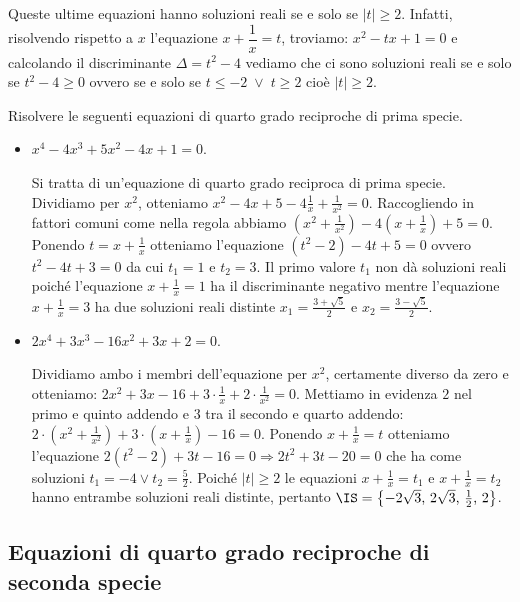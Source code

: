 Queste ultime equazioni hanno soluzioni reali se e solo se $|t|\ge 2$. Infatti, risolvendo rispetto a $x$ l'equazione $x+\dfrac 1 x=t$, troviamo: $x^2-tx+1=0$ e calcolando il discriminante $\Delta =t^2-4$ vediamo che ci sono soluzioni reali se e solo se $t^2-4\ge 0$ ovvero se e solo se $t\le -2 \;\vee\; t\ge 2$ cioè $|t|\ge 2$.
\begin{exrig}
 \begin{esempio}
 Risolvere le seguenti equazioni di quarto grado reciproche di prima specie.
 \begin{itemize}
 \item $x^4-4x^3+5x^2-4x+1=0$.

 Si tratta di un'equazione di quarto grado reciproca di prima specie. Dividiamo per $x^2$, otteniamo $x^2-4x+5-4\frac 1 x+\frac 1{x^2}=0$. Raccogliendo in fattori comuni come nella regola abbiamo $\left(x^2+\frac 1{x^2}\right)-4\left(x+\frac 1 x\right)+5=0$. Ponendo $t=x+\frac 1 x$ otteniamo l'equazione $ \left(t^2-2\right)-4t+5=0$ ovvero $t^2-4t+3=0$ da cui $t_1=1$ e $t_2=3$. Il primo valore $t_1$ non dà soluzioni reali poiché l'equazione $x+\frac 1 x=1$ ha il discriminante negativo mentre l'equazione $x+\frac 1 x=3$ ha due soluzioni reali distinte $x_1=\frac{3+\sqrt 5} 2$ e $x_2=\frac{3-\sqrt 5} 2$.

 \item $ 2x^4+3x^3-16x^2+3x+2=0 $.

 Dividiamo ambo i membri dell'equazione per $x^2$, certamente diverso da zero e otteniamo: $2x^2+3x-16+3\cdot \frac 1 x+2\cdot \frac 1{x^2}=0$. Mettiamo in evidenza $ 2 $ nel primo e quinto addendo e $ 3 $ tra il secondo e quarto addendo: $2\cdot \left(x^2+\frac 1{x^2}\right)+3\cdot \left(x+\frac 1 x\right)-16=0$. Ponendo $x+\frac 1 x=t$ otteniamo l'equazione $2(t^2-2)+3t-16=0\Rightarrow 2t^2+3t-20=0$ che ha come soluzioni $t_1=-4\vee t_2=\frac 5 2$. Poiché $|t|\ge 2$ le equazioni $x+\frac 1 x=t_1$ e $x+\frac 1 x=t_2$ hanno entrambe soluzioni reali distinte, pertanto $\IS=\left\{-2\sqrt{3}\text{, }2\sqrt{3}\text{, }\frac 1 2\text{, }2\right\}$.
 \end{itemize}
 \end{esempio}
\end{exrig}
\ovalbox{\risolvii \ref{ese:5.43}, \ref{ese:5.44}}

\subsection{Equazioni di quarto grado reciproche di seconda specie}

